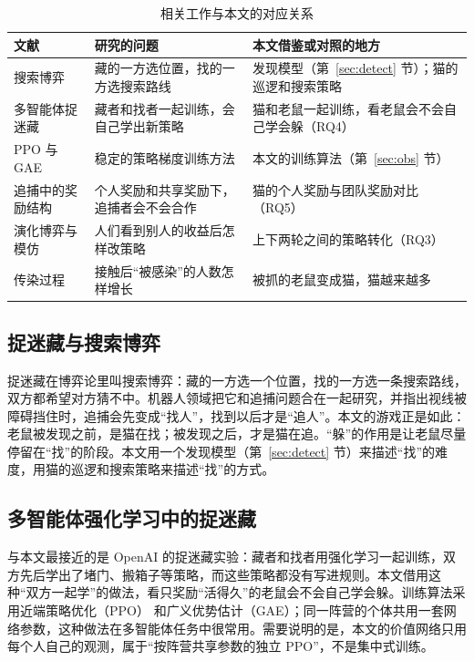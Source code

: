 \begin{table}[htbp]
  \centering\small
  \caption{相关工作与本文的对应关系}
  \label{tab:related}
  \renewcommand{\arraystretch}{1.25}
  \begin{tabularx}{\textwidth}{@{}p{3.1cm}X X@{}}
    \toprule
    文献 & 研究的问题 & 本文借鉴或对照的地方\\
    \midrule
    搜索博弈\cite{alpern2003,chung2011} & 藏的一方选位置，找的一方选搜索路线 & 发现模型（第~\ref{sec:detect} 节）；猫的巡逻和搜索策略\\
    多智能体捉迷藏\cite{baker2020} & 藏者和找者一起训练，会自己学出新策略 & 猫和老鼠一起训练，看老鼠会不会自己学会躲（RQ4）\\
    PPO 与 GAE\cite{schulman2017ppo,schulman2016gae,yu2022mappo} & 稳定的策略梯度训练方法 & 本文的训练算法（第~\ref{sec:obs} 节）\\
    追捕中的奖励结构\cite{grupen2022,leibo2017} & 个人奖励和共享奖励下，追捕者会不会合作 & 猫的个人奖励与团队奖励对比（RQ5）\\
    演化博弈与模仿\cite{taylor1978,szabo1998,traulsen2006} & 人们看到别人的收益后怎样改策略 & 上下两轮之间的策略转化（RQ3）\\
    传染过程\cite{kermack1927} & 接触后“被感染”的人数怎样增长 & 被抓的老鼠变成猫，猫越来越多\\
    \bottomrule
  \end{tabularx}
\end{table}

\subsection{捉迷藏与搜索博弈}
捉迷藏在博弈论里叫搜索博弈：藏的一方选一个位置，找的一方选一条搜索路线，双方都希望对方猜不中\cite{alpern2003}。机器人领域把它和追捕问题合在一起研究，并指出视线被障碍挡住时，追捕会先变成“找人”，找到以后才是“追人”\cite{chung2011}。本文的游戏正是如此：老鼠被发现之前，是猫在找；被发现之后，才是猫在追。“躲”的作用是让老鼠尽量停留在“找”的阶段。本文用一个发现模型（第~\ref{sec:detect} 节）来描述“找”的难度，用猫的巡逻和搜索策略来描述“找”的方式。

\subsection{多智能体强化学习中的捉迷藏}
与本文最接近的是 OpenAI 的捉迷藏实验\cite{baker2020}：藏者和找者用强化学习一起训练，双方先后学出了堵门、搬箱子等策略，而这些策略都没有写进规则。本文借用这种“双方一起学”的做法，看只奖励“活得久”的老鼠会不会自己学会躲。训练算法采用近端策略优化（PPO）\cite{schulman2017ppo} 和广义优势估计（GAE）\cite{schulman2016gae}；同一阵营的个体共用一套网络参数，这种做法在多智能体任务中很常用\cite{yu2022mappo}。需要说明的是，本文的价值网络只用每个人自己的观测，属于“按阵营共享参数的独立 PPO”，不是集中式训练。

